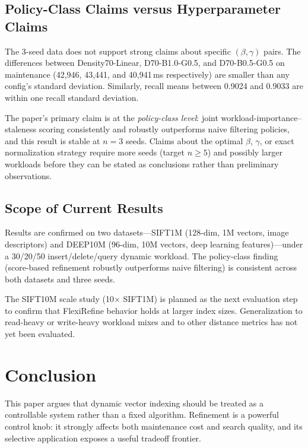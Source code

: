 \documentclass[sigconf, nonacm]{acmart}
\begin{document}
\subsection{Policy-Class Claims versus Hyperparameter Claims}

The 3-seed data does not support strong claims about specific
$(\beta, \gamma)$ pairs. The differences between Density70-Linear,
D70-B1.0-G0.5, and D70-B0.5-G0.5 on maintenance (42,946, 43,441, and
40,941\,ms respectively) are smaller than any config's standard
deviation. Similarly, recall means between 0.9024 and 0.9033 are within
one recall standard deviation.

The paper's primary claim is at the \emph{policy-class level}: joint
workload-importance--staleness scoring consistently and robustly
outperforms naive filtering policies, and this result is stable at
$n=3$ seeds. Claims about the optimal $\beta$, $\gamma$, or exact
normalization strategy require more seeds (target $n \geq 5$) and
possibly larger workloads before they can be stated as conclusions
rather than preliminary observations.

\subsection{Scope of Current Results}

Results are confirmed on two datasets---SIFT1M (128-dim, 1M vectors,
image descriptors) and DEEP10M (96-dim, 10M vectors, deep learning
features)---under a 30/20/50 insert/delete/query dynamic workload.
The policy-class finding (score-based refinement robustly outperforms
naive filtering) is consistent across both datasets and three seeds.

The SIFT10M scale study (10$\times$ SIFT1M) is planned as the next
evaluation step to confirm that FlexiRefine behavior holds at larger
index sizes. Generalization to read-heavy or write-heavy workload mixes
and to other distance metrics has not yet been evaluated.

\section{Conclusion}
\label{sec:conclusion}

This paper argues that dynamic vector indexing should be treated as a
controllable system rather than a fixed algorithm. Refinement is a
powerful control knob: it strongly affects both maintenance cost and
search quality, and its selective application exposes a useful
tradeoff frontier.
\end{document}
